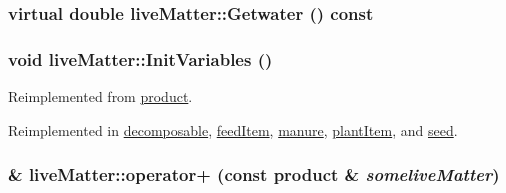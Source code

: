 \label{classlive_matter_a1688ff189b2809aeefd3b25b74f8446d}
\hypertarget{classlive_matter_a6a4839f1bc9ee6db69b25a7a66151f26}{
\subsubsection[{Getwater}]{\setlength{\rightskip}{0pt plus 5cm}virtual double liveMatter::Getwater () const}}
\label{classlive_matter_a6a4839f1bc9ee6db69b25a7a66151f26}
\hypertarget{classlive_matter_ab14efacc07e048507a6c3dd8d2942101}{
\subsubsection[{InitVariables}]{\setlength{\rightskip}{0pt plus 5cm}void liveMatter::InitVariables ()}}
\label{classlive_matter_ab14efacc07e048507a6c3dd8d2942101}


Reimplemented from \hyperlink{classproduct_afcbfb1feadfd4ed057845eab47e37ff5}{product}.

Reimplemented in \hyperlink{classdecomposable_aabfa1610321f138dff27b27e074cf9ea}{decomposable}, \hyperlink{classfeed_item_ae08d4c420b75b14c595dab525f96dd9d}{feedItem}, \hyperlink{classmanure_ac45a5d29b499ebe4f93a8473dc2cf821}{manure}, \hyperlink{classplant_item_a68b971164b0ea870d6d14c5b53ad8223}{plantItem}, and \hyperlink{classseed_aabcb716243f0c8e8c57f05cf0f140a17}{seed}.\hypertarget{classlive_matter_ae7a333e94f166a448a4b8f8b70ebe9fe}{
\subsubsection[{operator+}]{ \& liveMatter::operator+ (const {\bf product} \& {\em someliveMatter})}}
\label{classlive_matter_ae7a333e94f166a448a4b8f8b70ebe9fe}


